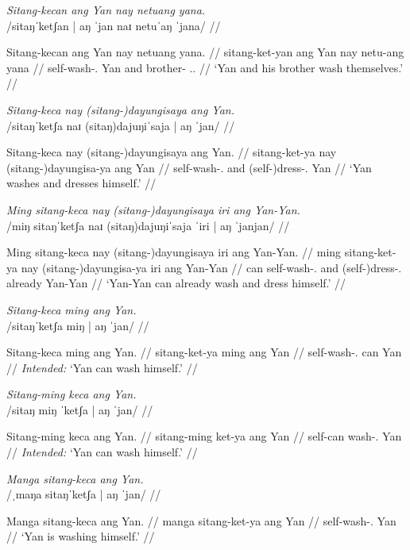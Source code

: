 \documentclass[12pt,a4paper]{scrartcl}
\newcommand{\TsgM}{{\Tsg}.{\M}}
\newcommand{\TplM}{{\Tpl}.{\M}}
\begin{document}
\ex\begingl
\glpreamble \textit{Sitang-kecan ang Yan nay netuang yana.}\\
	/sitaŋˈketʃan | aŋ ˈjan naɪ netuˈaŋ ˈjana/ //

\gla Sitang-kecan ang Yan nay netuang yana. //
\glb sitang-ket-yan ang Yan nay netu-ang yana //
\glc self-wash-\TplM{} \Aarg{} Yan and brother-\Aarg{} \TsgM{}.\Gen{} //
\glft `Yan and his brother wash themselves.' //
\endgl\xe

\ex\begingl
\glpreamble \textit{Sitang-keca nay (sitang-)dayungisaya ang Yan.}\\
	/sitaŋˈketʃa naɪ (sitaŋ)dajuŋiˈsaja | aŋ ˈjan/ //

\gla Sitang-keca nay (sitang-)dayungisaya ang Yan. //
\glb sitang-ket-ya nay (sitang-)dayungisa-ya ang Yan //
\glc self-wash-\TsgM{} and (self-)dress-\TsgM{} \Aarg{} Yan //
\glft `Yan washes and dresses himself.' //
\endgl\xe

\ex\begingl
\glpreamble \textit{Ming sitang-keca nay (sitang-)dayungisaya iri ang Yan-Yan.}\\
	/miŋ sitaŋˈketʃa naɪ (sitaŋ)dajuŋiˈsaja ˈiri | aŋ ˈjanjan/ //

\gla Ming sitang-keca nay (sitang-)dayungisaya iri ang Yan-Yan. //
\glb ming sitang-ket-ya nay (sitang-)dayungisa-ya iri ang Yan-Yan //
\glc can self-wash-\TsgM{} and (self-)dress-\TsgM{} already \Aarg{} Yan-Yan //
\glft `Yan-Yan can already wash and dress himself.' //
\endgl\xe
\xe

\pex
\a\ljudge*\begingl
\glpreamble \textit{Sitang-keca ming ang Yan.}\\
	/sitaŋˈketʃa miŋ | aŋ ˈjan/ //

\gla Sitang-keca ming ang Yan. //
\glb sitang-ket-ya ming ang Yan //
\glc self-wash-\TsgM{} can \Aarg{} Yan //
\glft \textit{Intended:} `Yan can wash himself.' //
\endgl

\a\ljudge*\begingl
\glpreamble \textit{Sitang-ming keca ang Yan.}\\
	/sitaŋ miŋ ˈketʃa | aŋ ˈjan/ //

\gla Sitang-ming keca ang Yan. //
\glb sitang-ming ket-ya ang Yan //
\glc self-can wash-\TsgM{} \Aarg{} Yan //
\glft \textit{Intended:} `Yan can wash himself.' //
\endgl

\xe

\pex
\a\begingl
\glpreamble \textit{Manga sitang-keca ang Yan.}\\
	/ˌmaŋa sitaŋˈketʃa | aŋ ˈjan/ //

\gla Manga sitang-keca ang Yan. //
\glb manga sitang-ket-ya ang Yan //
\glc \Prog{} self-wash-\TsgM{} \Aarg{} Yan //
\glft `Yan is washing himself.' //
\endgl
\end{document}
